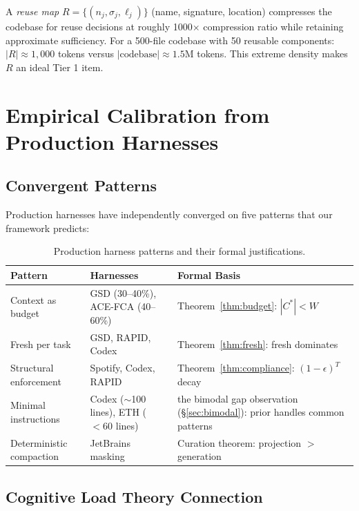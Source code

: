 \documentclass[11pt, a4paper, copyright]{googledeepmind}
\begin{document}
A \emph{reuse map} $R = \{(n_j, \sigma_j, \ell_j)\}$ (name, signature, location) compresses the codebase for reuse decisions at roughly 1000$\times$ compression ratio while retaining approximate sufficiency. For a 500-file codebase with 50 reusable components: $|R| \approx 1{,}000$ tokens versus $|\text{codebase}| \approx 1.5$M tokens. This extreme density makes $R$ an ideal Tier 1 item.


\section{Empirical Calibration from Production Harnesses}
\label{sec:empirical}

\subsection{Convergent Patterns}

Production harnesses have independently converged on five patterns that our framework predicts:

\begin{table}[H]
\centering
\small
\begin{tabularx}{\textwidth}{lXX}
\toprule
\textbf{Pattern} & \textbf{Harnesses} & \textbf{Formal Basis} \\
\midrule
Context as budget & GSD (30--40\%), ACE-FCA (40--60\%) & Theorem~\ref{thm:budget}: $|C^*| < W$ \\
Fresh per task & GSD, RAPID, Codex & Theorem~\ref{thm:fresh}: fresh dominates \\
Structural enforcement & Spotify, Codex, RAPID & Theorem~\ref{thm:compliance}: $(1-\epsilon)^T$ decay \\
Minimal instructions & Codex ($\sim$100 lines), ETH ($<60$ lines) & the bimodal gap observation (\S\ref{sec:bimodal}): prior handles common patterns \\
Deterministic compaction & JetBrains masking & Curation theorem: projection $>$ generation \\
\bottomrule
\end{tabularx}
\caption{Production harness patterns and their formal justifications.}
\label{tab:harness-patterns}
\end{table}

\subsection{Cognitive Load Theory Connection}
\end{document}
